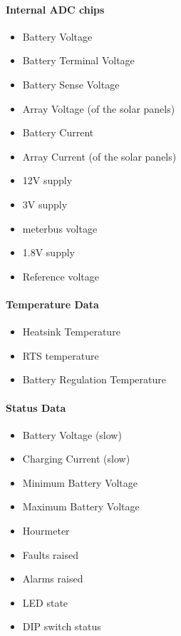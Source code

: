 \paragraph{Internal ADC chips}


\begin{itemize}
	\item Battery Voltage
	\item Battery Terminal Voltage
	\item Battery Sense Voltage
	\item Array Voltage (of the solar panels)
	\item Battery Current
	\item Array Current (of the solar panels)
	\item 12V supply
	\item 3V supply
	\item meterbus voltage
	\item 1.8V supply
	\item Reference voltage
\end{itemize}
\par
\paragraph{Temperature Data}
\begin{itemize}
	\item Heatsink Temperature
	\item RTS temperature
	\item Battery Regulation Temperature
\end{itemize}
\par 

\paragraph{Status Data}
\begin{itemize}
	\item Battery Voltage (slow)
	\item Charging Current (slow)
	\item Minimum Battery Voltage
	\item Maximum Battery Voltage
	\item Hourmeter
	\item Faults raised
	\item Alarms raised
	\item LED state
	\item DIP switch status
\end{itemize}
\par


